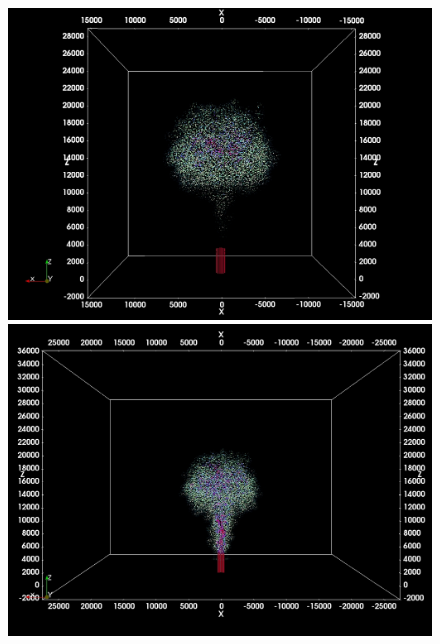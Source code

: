 \begin{figure}
    \begin{minipage}{.33\textwidth}
        \centering
        \includegraphics[width=0.99 \textwidth]{Chapter-6/Figures/ShortErupt/Erupt100_t150}
    \end{minipage}%
    \begin{minipage}{.33 \textwidth}
        \centering
        \includegraphics[width=0.99 \textwidth]{Chapter-6/Figures/ShortErupt/Erupt300_t150}
    \end{minipage}%
    \\
    \begin{minipage}{.33 \textwidth}
        \centering

\end{minipage}
\end{figure}
